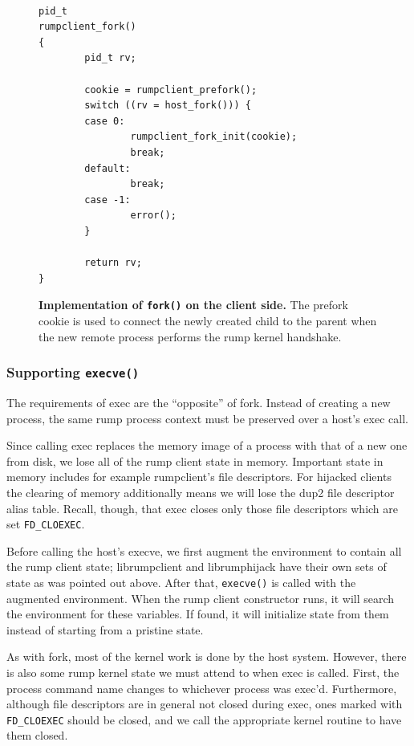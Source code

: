 \begin{figure}[t]
{\tt \scriptsize
\begin{verbatim}
pid_t
rumpclient_fork()
{
        pid_t rv;

        cookie = rumpclient_prefork();
        switch ((rv = host_fork())) {
        case 0:
                rumpclient_fork_init(cookie);
                break;
        default:
                break;
        case -1:
                error();
        }

        return rv;
}
\end{verbatim}}
\caption[Implementation of \texttt{fork()} on the client side]{
\textbf{Implementation of \texttt{fork()} on the client side.}
The prefork cookie is used to connect the newly created child to the
parent when the new remote process performs the rump kernel handshake.
}
\label{fig:rumpclient_fork}
\end{figure}

\subsubsection*{Supporting \texttt{execve()}}

The requirements of exec are the ``opposite'' of fork.  Instead of
creating a new process, the same rump process context must be
preserved over a host's exec call.

Since calling exec replaces the memory image of a process with that
of a new one from disk, we lose all of the rump client state in
memory.  Important state in memory includes for example rumpclient's
file descriptors.  For hijacked clients the clearing of memory
additionally means we will lose \eg the dup2 file descriptor alias table.
Recall, though, that exec closes only those file descriptors which are
set \verb+FD_CLOEXEC+.

Before calling the host's execve, we first augment the environment
to contain all the rump client state; librumpclient and librumphijack
have their own sets of state as was pointed out above.  After that,
\verb+execve()+ is called with the augmented environment.  When
the rump client constructor runs, it will search the environment
for these variables.  If found, it will initialize state from them
instead of starting from a pristine state.

As with fork, most of the kernel work is done by the host system.
However, there is also some rump kernel state we must attend to
when exec is called.  First, the process command name changes to
whichever process was exec'd.  Furthermore, although file descriptors
are in general not closed during exec, ones marked with \verb+FD_CLOEXEC+
should be closed, and we call the appropriate kernel routine to
have them closed.

